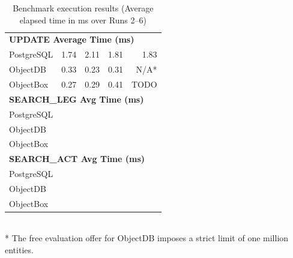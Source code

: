 \documentclass{article}
\begin{document}
\begin{table}[H]
\begin{tabular}{lrrrr}
        \midrule
        \multicolumn{5}{l}{\textbf{UPDATE Average Time (ms)}}                                                                                \\
        \quad PostgreSQL          & 1.74                   & 2.11                    & 1.81                     & 1.83                       \\
        \quad ObjectDB            & 0.33                   & 0.23                    & 0.31                     & N/A*                       \\
        \quad ObjectBox           & 0.27                   & 0.29                    & 0.41                     & TODO                      \\
        \midrule
        \multicolumn{5}{l}{\textbf{SEARCH\_LEG Avg Time (ms)}}                                                                           \\
        \quad PostgreSQL          &                        &                         &                          &                            \\
        \quad ObjectDB            &                        &                         &                          &                            \\
        \quad ObjectBox           &                        &                         &                          &                            \\
        \midrule
        \multicolumn{5}{l}{\textbf{SEARCH\_ACT Avg Time (ms)}}                                                                           \\
        \quad PostgreSQL          &                        &                         &                          &                            \\
        \quad ObjectDB            &                        &                         &                          &                            \\
        \quad ObjectBox           &                        &                         &                          &                            \\
        \bottomrule
    \end{tabular}
    \\ * The free evaluation offer for ObjectDB imposes a strict limit of one million entities.
    \caption{Benchmark execution results (Average elapsed time in ms over Runs 2--6)}
    \label{tab:benchmark_results}
\end{table}
\end{document}
